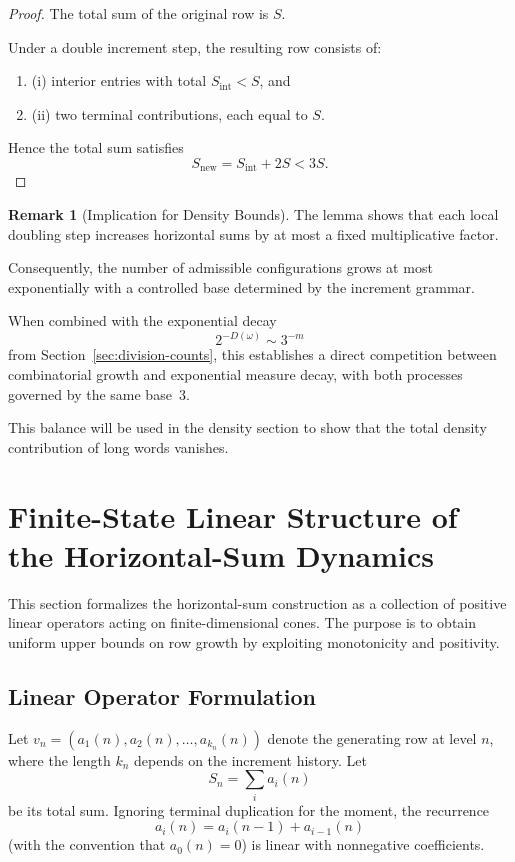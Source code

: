 \documentclass[12pt, oneside]{article}   	%
\numberwithin{equation}{section}          %
\theoremstyle{definition}
\newtheorem*{remark}{Remark}
\begin{document}
\newpage
\begin{proof}
The total sum of the original row is $S$.

Under a double increment step, the resulting row consists of:
\begin{enumerate}
    \item (i) interior entries with total $S_{\mathrm{int}} < S$, and
    \item (ii) two terminal contributions, each equal to $S$.
\end{enumerate}

Hence the total sum satisfies
\[
S_{\mathrm{new}} = S_{\mathrm{int}} + 2S < 3S.
\]
\end{proof}

\begin{remark}[Implication for Density Bounds]
The lemma shows that each local doubling step increases horizontal sums by
at most a fixed multiplicative factor.

Consequently, the number of admissible configurations grows at most exponentially
with a controlled base determined by the increment grammar.

When combined with the exponential decay
\[
2^{-D(\omega)} \sim 3^{-m}
\]
from Section~\ref{sec:division-counts},
this establishes a direct competition between combinatorial growth and
exponential measure decay, with both processes governed by the same base~3.

This balance will be used in the density section to show that the total
density contribution of long words vanishes.
\end{remark}


\newpage
\section{Finite-State Linear Structure of the Horizontal-Sum Dynamics}
\label{sec:linear-framework}

This section formalizes the horizontal-sum construction as a collection of
positive linear operators acting on finite-dimensional cones. The purpose is
to obtain uniform upper bounds on row growth by exploiting monotonicity and
positivity.

\subsection{Linear Operator Formulation}

Let $v_n = (a_1(n),a_2(n),\dots,a_{k_n}(n))$ denote the generating row at
level $n$, where the length $k_n$ depends on the increment history.
Let
\[
S_n = \sum_i a_i(n)
\]
be its total sum. Ignoring terminal duplication for the moment, the recurrence
\[
a_i(n)=a_i(n-1)+a_{i-1}(n)
\]
(with the convention that $a_0(n)=0$) is linear with nonnegative coefficients.
\end{document}
